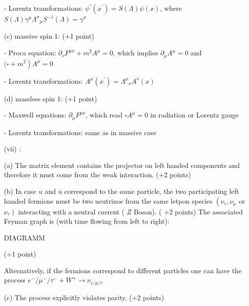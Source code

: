 \documentclass[10pt, letterpaper]{article}
\begin{document}
- Lorentz transformations: $\psi^{\prime}\left(x^{\prime}\right)=S(\Lambda) \psi(x)$, where $S(\Lambda) \gamma^\mu \Lambda^\sigma{ }_\mu S^{-1}(\Lambda)=\gamma^\sigma$

(c) massive spin 1: (+1 point)

- Proca equation: $\partial_\nu F^{\mu \nu}+m^2 A^\mu=0$, which implies $\partial_\mu A^\mu=0$ and $(\square+ \left.m^2\right) A^\mu=0$

- Lorentz transformations: $A^\mu\left(x^{\prime}\right)=\Lambda^\mu{ }_\nu A^\nu(x)$

(d) massless spin 1: (+1 point)

- Maxwell equations: $\partial_\mu F^{\mu \nu}$, which read $\square A^\mu=0$ in radiation or Lorentz gauge

- Lorentz transformations: same as in massive case

(vii) :

(a) The matrix element contains the projector on left handed components and therefore it must come from the weak interaction. (+2 points)

(b) In case $u$ and $\bar{u}$ correspond to the same particle, the two participating left handed fermions must be two neutrinos from the same letpon species $\left(\nu_e, \nu_\mu\right.$ or $\left.\nu_\tau\right)$ interacting with a neutral current ( $Z$ Boson). ( +2 points) The associated Feyman graph is (with time flowing from left to right):

DIAGRAMM

(+1 point)

Alternatively, if the fermions correspond to different particles one can have the process $e^{-} / \mu^{-} / \tau^{-}+W^{+} \rightarrow \nu_{e / \mu / \tau}$


(c) The process explicitly violates parity. (+2 points)

\printbibliography
\end{document}
